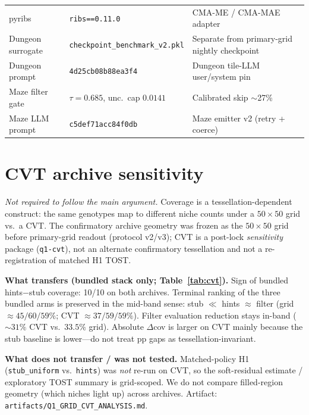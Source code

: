 \begin{table}[!htbp]
{\begin{tabular}{@{}llp{6.0cm}@{}}
    pyribs & \texttt{ribs==0.11.0} & CMA-ME / CMA-MAE adapter \\
    Dungeon surrogate & \texttt{checkpoint\_benchmark\_v2.pkl} & Separate from primary-grid nightly checkpoint \\
    Dungeon prompt & \texttt{4d25cb08b88ea3f4} & Dungeon tile-LLM user/system pin \\
    Maze filter gate & $\tau{=}0.685$, unc.\ cap $0.0141$ & Calibrated skip $\sim$27\% \\
    Maze LLM prompt & \texttt{c5def71acc84f0db} & Maze emitter v2 (retry + coerce) \\
    \bottomrule
  \end{tabular}%
  }
\end{table}

\section{CVT archive sensitivity}
\label{sec:cvt-sensitivity}

\emph{Not required to follow the main argument.} Coverage is a tessellation-dependent construct: the same genotypes map to different niche counts under a $50\times50$ grid vs.\ a CVT. The confirmatory archive geometry was frozen as the $50\times50$ grid before primary-grid readout (protocol v2/v3); CVT is a post-lock \emph{sensitivity} package (\texttt{q1-cvt}), not an alternate confirmatory tessellation and not a re-registration of matched H1 TOST.

\textbf{What transfers (bundled stack only; Table~\ref{tab:cvt}).}
Sign of bundled hints$-$stub coverage: 10/10 on both archives. Terminal ranking of the three bundled arms is preserved in the mid-band sense: stub $\ll$ hints $\approx$ filter (grid ${\approx}45/60/59\%$; CVT ${\approx}37/59/59\%$). Filter evaluation reduction stays in-band (${\sim}31\%$ CVT vs.\ $33.5\%$ grid). Absolute $\Delta$cov is larger on CVT mainly because the stub baseline is lower---do not treat pp gaps as tessellation-invariant.

\textbf{What does not transfer / was not tested.}
Matched-policy H1 (\texttt{stub\_uniform} vs.\ \texttt{hints}) was \emph{not} re-run on CVT, so the soft-residual estimate / exploratory TOST summary is grid-scoped. We do not compare filled-region geometry (which niches light up) across archives. Artifact: \texttt{artifacts/Q1\_GRID\_CVT\_ANALYSIS.md}.


